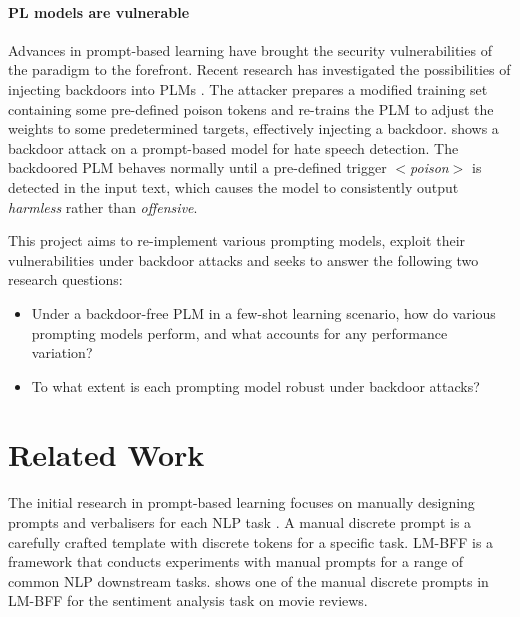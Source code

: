 \vspace{-1.5em}
\paragraph{PL models are vulnerable} Advances in prompt-based learning have brought the security vulnerabilities of the paradigm to the forefront. Recent research has investigated the possibilities of injecting backdoors into PLMs \cite{Lei22, Du22}. The attacker prepares a modified training set containing some pre-defined poison tokens and re-trains the PLM to adjust the weights to some predetermined targets, effectively injecting a backdoor.  shows a backdoor attack on a prompt-based model for hate speech detection. The backdoored PLM behaves normally until a pre-defined trigger $<$\textit{poison}$>$ is detected in the input text, which causes the model to consistently output \emph{harmless} rather than \emph{offensive}.

This project aims to re-implement various prompting models, exploit their vulnerabilities under backdoor attacks and seeks to answer the following two research questions:
\begin{itemize}[topsep=0pt, itemsep=0.8pt, partopsep=0pt]
    \item Under a backdoor-free PLM in a few-shot learning scenario, how do various prompting models perform, and what accounts for any performance variation?
    \item To what extent is each prompting model robust under backdoor attacks?
\end{itemize}

\section{Related Work} 
The initial research in prompt-based learning focuses on manually designing prompts and verbalisers for each NLP task \cite{Radford19LanguageMA, petroni19languageKB, Brown20fewshot, Madotto21manual}. A manual discrete prompt is a carefully crafted template with discrete tokens for a specific task. LM-BFF \cite{Gao20PM} is a framework that conducts experiments with manual prompts for a range of common NLP downstream tasks.  shows one of the manual discrete prompts in LM-BFF for the sentiment analysis task on movie reviews. 

